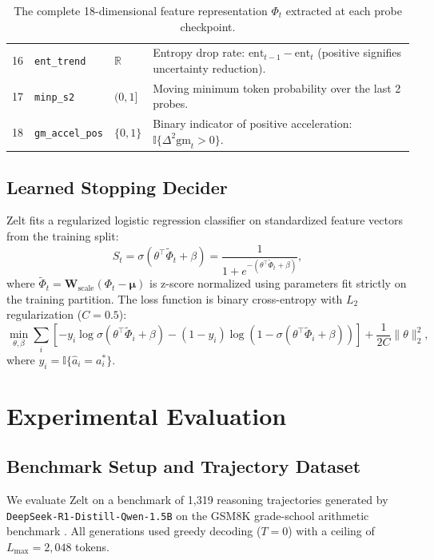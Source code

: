 \documentclass[11pt]{article}
\newcommand{\I}{\mathbb{I}}
\begin{document}
\begin{table}[ht]
\begin{tabularx}{\linewidth}{lllX}
16 & \texttt{ent\_trend} & $\mathbb{R}$ & Entropy drop rate: $\mathrm{ent}_{t-1} - \mathrm{ent}_t$ (positive signifies uncertainty reduction). \\
17 & \texttt{minp\_s2} & $(0, 1]$ & Moving minimum token probability over the last 2 probes. \\
18 & \texttt{gm\_accel\_pos} & $\{0, 1\}$ & Binary indicator of positive acceleration: $\I\{\Delta^2 \mathrm{gm}_t > 0\}$. \\
\bottomrule
\end{tabularx}
\caption{The complete 18-dimensional feature representation $\Phi_t$ extracted at each probe checkpoint.}
\label{tab:features}
\end{table}

\subsection{Learned Stopping Decider}
Zelt fits a regularized logistic regression classifier on standardized feature vectors from the training split:
\begin{equation}
  S_t = \sigma\left(\theta^\top \tilde{\Phi}_t + \beta\right) = \frac{1}{1 + e^{-(\theta^\top \tilde{\Phi}_t + \beta)}},
\end{equation}
where $\tilde{\Phi}_t = \mathbf{W}_{\mathrm{scale}}(\Phi_t - \boldsymbol{\mu})$ is z-score normalized using parameters fit strictly on the training partition. The loss function is binary cross-entropy with $L_2$ regularization ($C=0.5$):
\begin{equation}
  \min_{\theta, \beta} \sum_{i} \left[ -y_i \log \sigma(\theta^\top \tilde{\Phi}_i + \beta) - (1-y_i) \log(1 - \sigma(\theta^\top \tilde{\Phi}_i + \beta)) \right] + \frac{1}{2C}\|\theta\|_2^2,
\end{equation}
where $y_i = \I\{\hat{a}_i = a_i^*\}$.

\section{Experimental Evaluation}
\label{sec:experiments}

\subsection{Benchmark Setup and Trajectory Dataset}
We evaluate Zelt on a benchmark of 1{,}319 reasoning trajectories generated by \texttt{DeepSeek-R1-Distill-Qwen-1.5B} on the GSM8K grade-school arithmetic benchmark \citep{cobbe2021gsm8k}. All generations used greedy decoding ($T=0$) with a ceiling of $L_{\max} = 2{,}048$ tokens.
\end{document}
